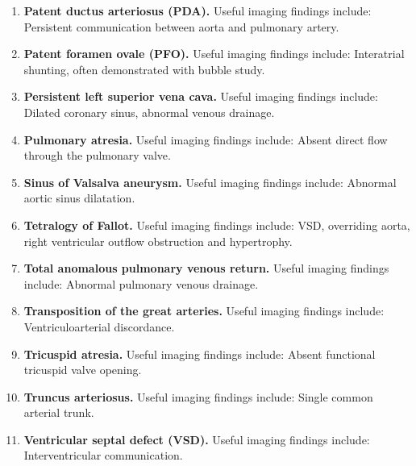 \begin{enumerate}[leftmargin=*,itemsep=0.45em,topsep=0.4em]
\item \textbf{Patent ductus arteriosus (PDA).} Useful imaging findings include: Persistent communication between aorta and pulmonary artery.
\item \textbf{Patent foramen ovale (PFO).} Useful imaging findings include: Interatrial shunting, often demonstrated with bubble study.
\item \textbf{Persistent left superior vena cava.} Useful imaging findings include: Dilated coronary sinus, abnormal venous drainage.
\item \textbf{Pulmonary atresia.} Useful imaging findings include: Absent direct flow through the pulmonary valve.
\item \textbf{Sinus of Valsalva aneurysm.} Useful imaging findings include: Abnormal aortic sinus dilatation.
\item \textbf{Tetralogy of Fallot.} Useful imaging findings include: VSD, overriding aorta, right ventricular outflow obstruction and hypertrophy.
\item \textbf{Total anomalous pulmonary venous return.} Useful imaging findings include: Abnormal pulmonary venous drainage.
\item \textbf{Transposition of the great arteries.} Useful imaging findings include: Ventriculoarterial discordance.
\item \textbf{Tricuspid atresia.} Useful imaging findings include: Absent functional tricuspid valve opening.
\item \textbf{Truncus arteriosus.} Useful imaging findings include: Single common arterial trunk.
\item \textbf{Ventricular septal defect (VSD).} Useful imaging findings include: Interventricular communication.
\end{enumerate}

